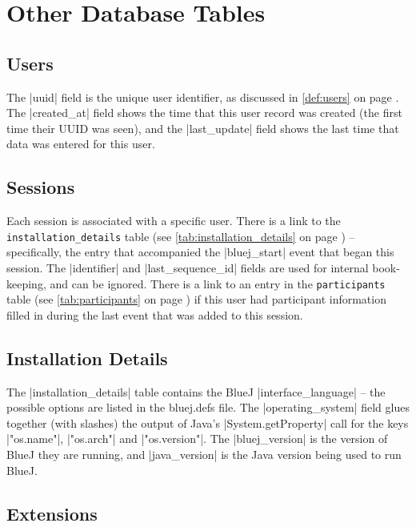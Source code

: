 \documentclass{report}
\newcommand{\myref}[1]{\autoref{#1} on page \pageref*{#1}}
\newcommand{\tabref}[1]{\lstinline|#1| table (see \myref{tab:#1})}
\newcommand{\intern}{This table may be interned, see \myref{def:intern}.}
\begin{document}
\chapter{Other Database Tables}
\label{sec:other_tables}

\section{Users}


The |uuid| field is the unique user identifier, as discussed in \myref{def:users}.
The |created_at| field shows the time that this user record was
created (the first time their UUID was seen), and the |last_update| field shows the last time that data was entered for
this user.

\section{Sessions}


Each session is associated with a specific user.  There is a link to
the \tabref{installation_details} -- specifically, the entry that
accompanied the |bluej_start| event that began this session.  The
|identifier| and |last_sequence_id| fields are used for internal
book-keeping, and can be ignored.  There is a link to an entry in the
\tabref{participants} if this user had participant information filled in
during the last event that was added to this session.

\section{Installation Details}


The |installation_details| table contains the BlueJ |interface_language| -- the
possible options are listed in the bluej.defs file.  The |operating_system|
field glues together (with slashes) the output of Java's |System.getProperty|
call for the keys |"os.name"|, |"os.arch"| and |"os.version"|.  The
|bluej_version| is the version of BlueJ they are running, and |java_version|
is the Java version being used to run BlueJ.

\section{Extensions}
\end{document}
